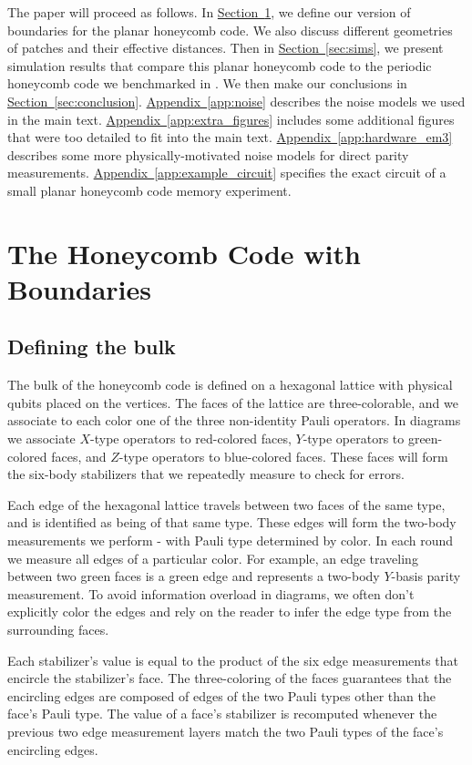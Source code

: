 \documentclass[onecolumn,a4paper,accepted=2022-09-12]{quantumarticle}
\theoremstyle{definition}
\theoremstyle{definition}
\theoremstyle{definition}
\renewcommand{\sec}[1]{\hyperref[sec:#1]{Section~\ref*{sec:#1}}}
\DeclareRobustCommand{\app}[1]{\hyperref[app:#1]{Appendix~\ref*{app:#1}}}
\begin{document}
The paper will proceed as follows.  
In \sec{boundaries}, we define our version of boundaries for the planar honeycomb code. 
We also discuss different geometries of patches and their effective distances.
Then in \sec{sims}, we present simulation results that compare this planar honeycomb code to the periodic honeycomb code we benchmarked in \cite{gidney2021honeycombmemory}.
We then make our conclusions in \sec{conclusion}.
\app{noise} describes the noise models we used in the main text.
\app{extra_figures} includes some additional figures that were too detailed to fit into the main text.
\app{hardware_em3} describes some more physically-motivated noise models for direct parity measurements. 
\app{example_circuit} specifies the exact circuit of a small planar honeycomb code memory experiment.

\section{The Honeycomb Code with Boundaries}
\label{sec:boundaries}

\subsection{Defining the bulk}

The bulk of the honeycomb code is defined on a hexagonal lattice with physical qubits placed on the vertices.  
The faces of the lattice are three-colorable, and we associate to each color one of the three non-identity Pauli operators.  
In diagrams we associate $X$-type operators to red-colored faces, $Y$-type operators to green-colored faces, and $Z$-type operators to blue-colored faces.  
These faces will form the six-body stabilizers that we repeatedly measure to check for errors. 

Each edge of the hexagonal lattice travels between two faces of the same type, and is identified as being of that same type.
These edges will form the two-body measurements we perform - with Pauli type determined by color.
In each round we measure all edges of a particular color.
For example, an edge traveling between two green faces is a green edge and represents a two-body $Y$-basis parity measurement.
To avoid information overload in diagrams, we often don't explicitly color the edges and rely on the reader to infer the edge type from the surrounding faces.

Each stabilizer's value is equal to the product of the six edge measurements that encircle the stabilizer's face.
The three-coloring of the faces guarantees that the encircling edges are composed of edges of the two Pauli types other than the face's Pauli type.
The value of a face's stabilizer is recomputed whenever the previous two edge measurement layers match the two Pauli types of the face's encircling edges.
\end{document}
